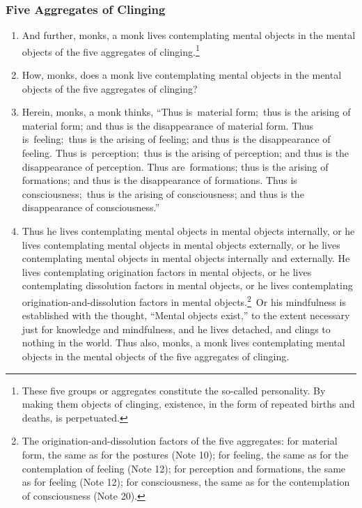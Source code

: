 \documentclass[a4 paper, 12pt]{article}
\begin{document}
\subsubsection*{Five Aggregates of Clinging}
\begin{enumerate}[resume]
\item And further, monks, a monk lives contemplating mental objects in the mental objects of the five aggregates of clinging.\footnote{These five groups or aggregates constitute the so-called personality. By making them objects of clinging, existence, in the form of repeated births and deaths, is perpetuated.}
\item How, monks, does a monk live contemplating mental objects in the mental objects of the five aggregates of clinging?
\item Herein, monks, a monk thinks, “Thus is material form; thus is the arising of material form; and thus is the disappearance of material form. Thus is feeling; thus is the arising of feeling; and thus is the disappearance of feeling. Thus is perception; thus is the arising of perception; and thus is the disappearance of perception. Thus are formations; thus is the arising of formations; and thus is the disappearance of formations. Thus is consciousness; thus is the arising of consciousness; and thus is the disappearance of consciousness.”
\item Thus he lives contemplating mental objects in mental objects internally, or he lives contemplating mental objects in mental objects externally, or he lives contemplating mental objects in mental objects internally and externally. He lives contemplating origination factors in mental objects, or he lives contemplating dissolution factors in mental objects, or he lives contemplating origination-and-dissolution factors in mental objects.\footnote{The origination-and-dissolution factors of the five aggregates: for material form, the same as for the postures (Note 10); for feeling, the same as for the contemplation of feeling (Note 12); for perception and formations, the same as for feeling (Note 12); for consciousness, the same as for the contemplation of consciousness (Note 20).} Or his mindfulness is established with the thought, “Mental objects exist,” to the extent necessary just for knowledge and mindfulness, and he lives detached, and clings to nothing in the world. Thus also, monks, a monk lives contemplating mental objects in the mental objects of the five aggregates of clinging.
\end{enumerate}
\end{document}

